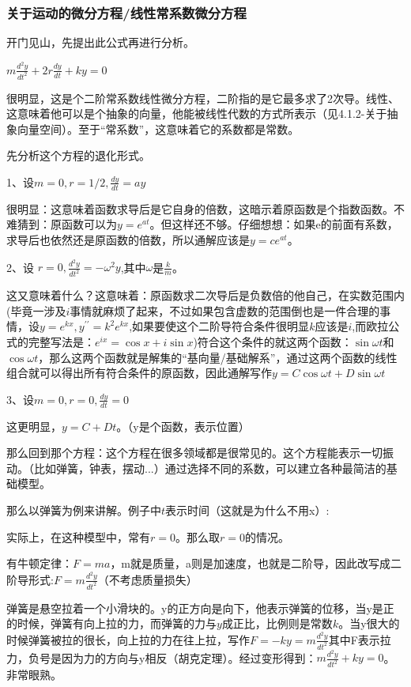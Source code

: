 \documentclass[UTF8]{ctexbook}
\newcommand{\doubleDerivative}{^{\prime\prime}}
\begin{document}
{{{{}%

\subsubsection{关于运动的微分方程/线性常系数微分方程}{
开门见山，先提出此公式再进行分析。

$m\frac{d^2y}{dt^2} + 2r\frac{dy}{dt} + ky = 0$

很明显，这是个二阶常系数线性微分方程，二阶指的是它最多求了2次导。线性、这意味着他可以是个抽象的向量，他能被线性代数的方式所表示（见4.1.2-关于抽象向量空间）。至于“常系数”，这意味着它的系数都是常数。

先分析这个方程的退化形式。

1、设$m = 0, r = 1/2, \frac{dy}{dt} = ay$

很明显：这意味着函数求导后是它自身的倍数，这暗示着原函数是个指数函数。不难猜到：原函数可以为$y = e^{at}$。但这样还不够。仔细想想：如果e的前面有系数，求导后也依然还是原函数的倍数，所以通解应该是$y = ce^{at}$。

2、设 $r = 0, \frac{d^2y}{dt^2} = -\omega^2y$,其中$\omega$是$\frac{k}{m}$。

这又意味着什么？这意味着：原函数求二次导后是负数倍的他自己，在实数范围内(毕竟一涉及$i$事情就麻烦了起来，不过如果包含虚数的范围倒也是一件合理的事情，设$y=e^{kx},y\doubleDerivative = k^{2}e^{kx}$,如果要使这个二阶导符合条件很明显$k$应该是$i$,而欧拉公式的完整写法是：$e^{ix} = \cos x + i\sin x$)符合这个条件的就这两个函数：$\sin\omega t$和$\cos\omega t$，那么这两个函数就是解集的“基向量/基础解系”，通过这两个函数的线性组合就可以得出所有符合条件的原函数，因此通解写作$y = C\cos\omega t + D\sin\omega t$

3、设$m = 0, r = 0, \frac{dy}{dt} = 0$

这更明显，$y = C + Dt$。（y是个函数，表示位置）

那么回到那个方程：这个方程在很多领域都是很常见的。这个方程能表示一切振动。（比如弹簧，钟表，摆动...）通过选择不同的系数，可以建立各种最简洁的基础模型。

那么以弹簧为例来讲解。例子中$t$表示时间（这就是为什么不用x）:

实际上，在这种模型中，常有$r = 0$。那么取$ r = 0$的情况。

有牛顿定律：$F = ma$，m就是质量，a则是加速度，也就是二阶导，因此改写成二阶导形式:$F = m\frac{d^2y}{dt^2}$（不考虑质量损失）

弹簧是悬空拉着一个小滑块的。y的正方向是向下，他表示弹簧的位移，当y是正的时候，弹簧有向上拉的力，而弹簧的力与$y$成正比，比例则是常数$k$。当y很大的时候弹簧被拉的很长，向上拉的力在往上拉，写作$F = -ky = m\frac{d^2y}{dt^2}$其中F表示拉力，负号是因为力的方向与y相反（胡克定理）。经过变形得到：$m\frac{d^2y}{dt^2} + ky = 0$。非常眼熟。

}}}}
\end{document}
